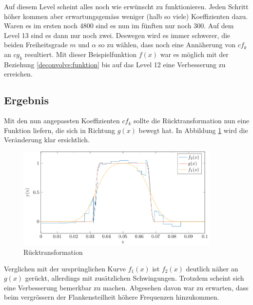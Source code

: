 Auf diesem Level scheint alles noch wie erwünscht zu funktionieren.
Jeden Schritt höher kommen aber erwartungsgemäss weniger (halb so viele) Koeffizienten dazu.
Waren es im ersten noch 4800 sind es nun im fünften nur noch 300.
Auf dem Level 13 sind es dann nur noch zwei.
Deswegen wird es immer schwerer, die beiden Freiheitsgrade $m$ und $\alpha$ so zu wählen, dass noch eine Annäherung von $cf_k$ an $cg_k$ resultiert.
Mit dieser Beispielfunktion $f(x)$ war es möglich mit der Beziehung \eqref{deconvolve:funktion} bis auf das Level 12 eine Verbesserung zu erreichen.

\subsection{Ergebnis}
Mit den nun angepassten Koeffizienten $cf_k$ sollte die Rücktransformation nun eine Funktion liefern, die sich in Richtung $g(x)$ bewegt hat.
In Abbildung \ref{deconvolve:result_1d} wird die Veränderung klar ersichtlich.
\begin{figure}[h]
\centering
\includegraphics[width=0.9\textwidth]{./papers/deconvolve/pictures/result_1d.pdf}
\caption{Rücktransformation\label{deconvolve:result_1d}}
\end{figure}

Verglichen mit der ursprünglichen Kurve $f_1(x)$ ist $f_2(x)$ deutlich näher an $g(x)$ gerückt, allerdings mit zusätzlichen Schwingungen.
Trotzdem scheint sich eine Verbesserung bemerkbar zu machen.
Abgesehen davon war zu erwarten, dass beim vergrössern der Flankensteilheit höhere Frequenzen hinzukommen.